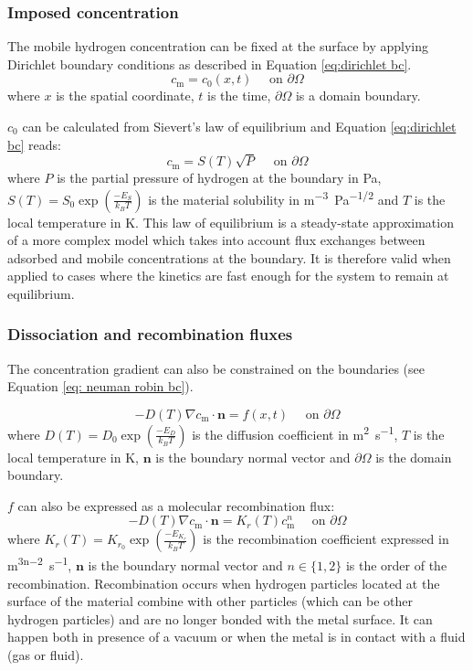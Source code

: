 \subsubsection{Imposed concentration}

The mobile hydrogen concentration can be fixed at the surface by applying Dirichlet boundary conditions as described in Equation \ref{eq:dirichlet bc}.
\begin{equation}
    c_\mathrm{m} = c_0(x, t) \quad \text { on } \partial \Omega
    \label{eq:dirichlet bc}
\end{equation}
where $x$ is the spatial coordinate, $t$ is the time, $\partial \Omega$ is a domain boundary.

$c_0$ can be calculated from Sievert's law of equilibrium and Equation \ref{eq:dirichlet bc} reads:
\begin{equation}
    c_\mathrm{m} = S(T) \sqrt{P}\quad \text { on } \partial \Omega
    \label{eq: Sievert's law}
\end{equation}
where $P$ is the partial pressure of hydrogen at the boundary in \si{Pa}, $S(T)=S_0 \exp(\frac{-E_S}{k_B T})$ is the material solubility in \si{m^{-3}.Pa^{-1/2}} and $T$ is the local temperature in \si{K}.
This law of equilibrium is a steady-state approximation of a more complex model which takes into account flux exchanges between adsorbed and mobile concentrations at the boundary.
It is therefore valid when applied to cases where the kinetics are fast enough for the system to remain at equilibrium.

\subsubsection{Dissociation and recombination fluxes}

The concentration gradient can also be constrained on the boundaries (see Equation \ref{eq: neuman robin bc}).

\begin{equation}
    - D(T)\nabla c_\mathrm{m} \cdot \mathbf{n} = f(x, t) \quad \text { on } \partial \Omega
    \label{eq: neuman robin bc}
\end{equation}
where $D(T) = D_0 \exp(\frac{-E_D}{k_B T}) $ is the diffusion coefficient in \si{m^2.s^{-1}}, $T$ is the local temperature in \si{K}, $\mathbf{n}$ is the boundary normal vector and $\partial \Omega$ is the domain boundary.

$f$ can also be expressed as a molecular recombination flux:
\begin{equation}
    - D(T)\nabla c_\mathrm{m} \cdot \mathbf{n} = K_r(T) c_\mathrm{m}^n \quad \text { on } \partial \Omega
    \label{eq: recombination flux}
\end{equation}
where $K_r(T) = K_{r_0} \exp(\frac{-E_{K_r}}{k_B T}) $ is the recombination coefficient expressed in \si{m^{3n-2}.s^{-1}}, $\mathbf{n}$ is the boundary normal vector and $n \in \{1, 2\}$ is the order of the recombination.
Recombination occurs when hydrogen particles located at the surface of the material combine with other particles (which can be other hydrogen particles) and are no longer bonded with the metal surface.
It can happen both in presence of a vacuum or when the metal is in contact with a fluid (gas or fluid).


